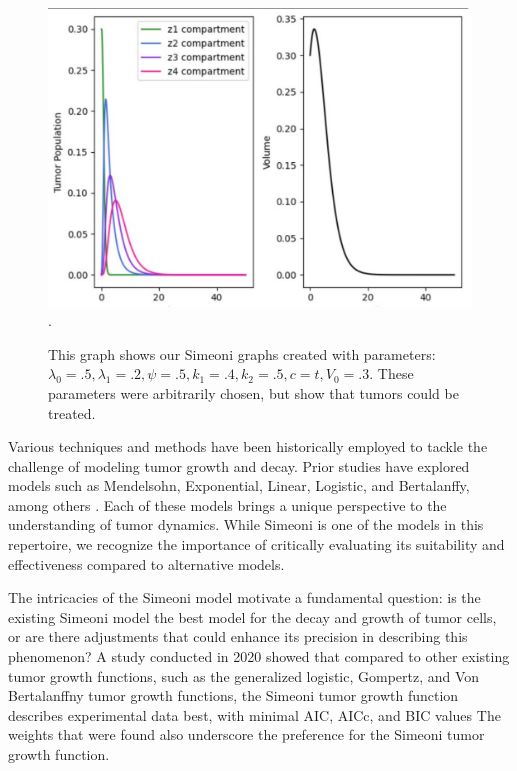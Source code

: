 \documentclass[11pt,reqno]{amsart}
\begin{document}
\begin{figure}[h]

\begin{center} %
\includegraphics[width=\textwidth]{original_tumor_random_parameters.pdf}. %
\end{center}
\caption{This graph shows our Simeoni graphs created with parameters: $\lambda_0=.5, \lambda_1=.2, \psi=.5, k_1 = .4, k_2=.5, c=t, V_0 = .3$. These parameters were arbitrarily chosen, but show that tumors could be treated.}
\label{fig:1}
\end{figure}

Various techniques and methods have been historically employed to tackle the challenge of modeling tumor growth and decay. Prior studies have explored models such as Mendelsohn, Exponential, Linear, Logistic, and Bertalanffy, among others \cite{Murphy_Hope_2016}. Each of these models brings a unique perspective to the understanding of tumor dynamics. While Simeoni is one of the models in this repertoire, we recognize the importance of critically evaluating its suitability and effectiveness compared to alternative models.

The intricacies of the Simeoni model motivate a fundamental question: is the existing Simeoni model the best model for the decay and growth of tumor cells, or are there adjustments that could enhance its precision in describing this phenomenon? A study conducted in 2020 showed that compared to other existing tumor growth functions, such as the generalized logistic, Gompertz, and Von Bertalanffny tumor growth functions, the Simeoni tumor growth function describes experimental data best, with minimal AIC, AICc, and BIC values\cite{Koziol_Falls_Schnitzer_2020}  The weights that were found also underscore the preference for the Simeoni tumor growth function.
\end{document}
